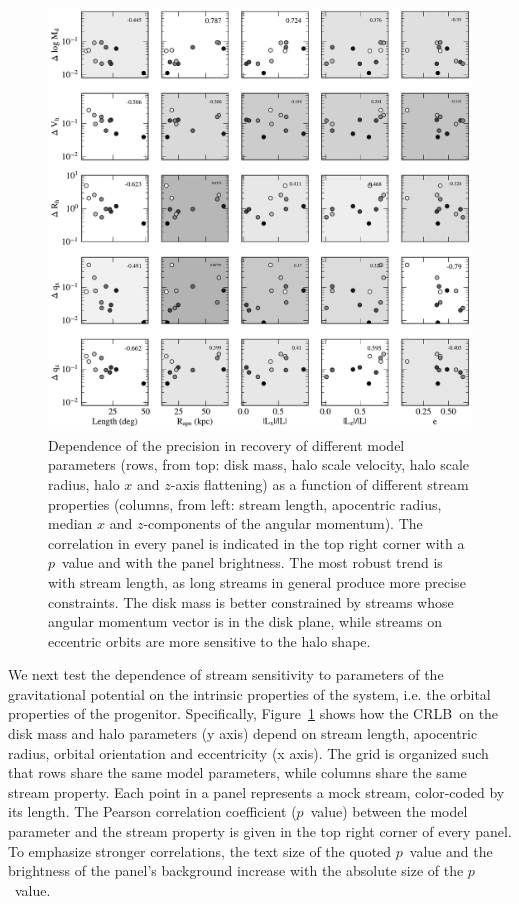 \documentclass[modern]{aastex62}
\newcommand{\acronym}[1]{{\small{#1}}}
\newcommand{\CRLB}{\acronym{CRLB}}
\begin{document}
\begin{figure}
\begin{center}
\includegraphics[width=\textwidth]{orbit_correlations.pdf}
\caption{Dependence of the precision in recovery of different model parameters (rows, from top: disk mass, halo scale velocity, halo scale radius, halo $x$ and $z$-axis flattening) as a function of different stream properties (columns, from left: stream length, apocentric radius, median $x$ and $z$-components of the angular momentum).
The correlation in every panel is indicated in the top right corner with a $p$~value and with the panel brightness.
The most robust trend is with stream length, as long streams in general produce more precise constraints.
The disk mass is better constrained by streams whose angular momentum vector is in the disk plane, while streams on eccentric orbits are more sensitive to the halo shape.}
\label{fig:orbit_correlations}
\end{center}
\end{figure}

We next test the dependence of stream sensitivity to parameters of the gravitational potential on the intrinsic properties of the system, i.e. the orbital properties of the progenitor.
Specifically, Figure~\ref{fig:orbit_correlations} shows how the \CRLB\ on the disk mass and halo parameters (y axis) depend on stream length, apocentric radius, orbital orientation and eccentricity (x axis).
The grid is organized such that rows share the same model parameters, while columns share the same stream property.
Each point in a panel represents a mock stream, color-coded by its length.
The Pearson correlation coefficient ($p$~value) between the model parameter and the stream property is given in the top right corner of every panel.
To emphasize stronger correlations, the text size of the quoted $p$~value and the brightness of the panel's background increase with the absolute size of the $p$~value.
\end{document}

